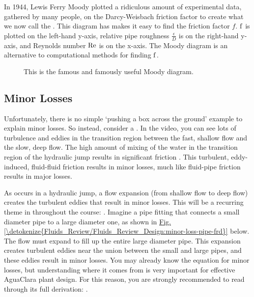 \documentclass[letterpaper,10pt,english]{sphinxmanual}
\let\sphinxpxdimen\pdfpxdimen\else\newdimen\sphinxpxdimen
\begin{document}
In 1944, Lewis Ferry Moody plotted a ridiculous amount of experimental data, gathered by many people, on the Darcy-Weisbach friction factor to create what we now call the . This diagram has makes it easy to find the friction factor \(f\). \(\rm{f}\) is plotted on the left-hand y-axis, relative pipe roughness \(\frac{\epsilon}{D}\) is on the right-hand y-axis, and Reynolds number \(\rm{Re}\) is on the x-axis. The Moody diagram is an alternative to computational methods for finding \(\rm{f}\).

\begin{figure}[htbp]
\centering
\capstart

\noindent\sphinxincludegraphics[width=650\sphinxpxdimen]{{Moody}.jpg}
\caption{This is the famous and famously useful Moody diagram.}\label{\detokenize{Fluids_Review/Fluids_Review_Design:id16}}\label{\detokenize{Fluids_Review/Fluids_Review_Design:moody}}\end{figure}


\subsection{Minor Losses}
\label{\detokenize{Fluids_Review/Fluids_Review_Design:minor-losses}}\label{\detokenize{Fluids_Review/Fluids_Review_Design:id8}}
Unfortunately, there is no simple ‘pushing a box across the ground’ example to explain minor losses. So instead, consider a . In the video, you can see lots of turbulence and eddies in the transition region between the fast, shallow flow and the slow, deep flow. The high amount of mixing of the water in the transition region of the hydraulic jump results in significant friction . This turbulent, eddy-induced, fluid-fluid friction results in  minor losses, much like fluid-pipe friction results in major losses.

As occurs in a hydraulic jump, a flow expansion (from shallow flow to deep flow) creates the turbulent eddies that result in minor losses. This will be a recurring theme in throughout the course: . Imagine a pipe fitting that connects a small diameter pipe to a large diameter one, as shown in \hyperref[\detokenize{Fluids_Review/Fluids_Review_Design:minor-loss-pipe-frd}]{Fig.\@ \ref{\detokenize{Fluids_Review/Fluids_Review_Design:minor-loss-pipe-frd}}} below. The flow must expand to fill up the entire large diameter pipe. This expansion creates turbulent eddies near the union between the small and large pipes, and these eddies result in minor losses. You may already know the equation for minor losses, but understanding where it comes from is very important for effective AguaClara plant design. For this reason, you are strongly recommended to read through its full derivation: {\hyperref[\detokenize{Fluids_Review/Fluids_Review_Derivations:fluids-review-derivations}]{}}.
\end{document}
